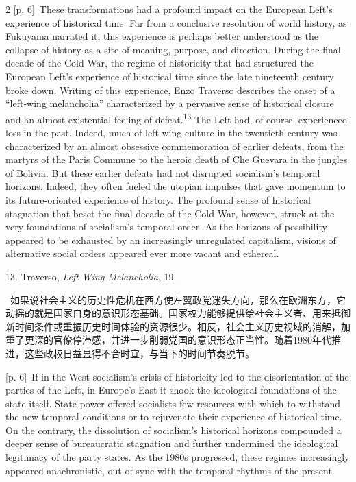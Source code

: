 \documentclass[10pt,a4paper]{article}
\begin{document}
\begin{paracol}{2}
\switchcolumn
{\scriptsize\color{gray} [p. 6]}\ These transformations had a profound impact on the European Left’s experience of historical time. Far from a conclusive resolution of world history, as Fukuyama narrated it, this experience is perhaps better understood as the collapse of history as a site of meaning, purpose, and direction. During the final decade of the Cold War, the regime of historicity that had structured the European Left’s experience of historical time since the late nineteenth century broke down. Writing of this experience, Enzo Traverso describes the onset of a “left-wing melancholia” characterized by a pervasive sense of historical closure and an almost existential feeling of defeat.\nobreak\textsuperscript{13} The Left had, of course, experienced loss in the past. Indeed, much of left-wing culture in the twentieth century was characterized by an almost obsessive commemoration of earlier defeats, from the martyrs of the Paris Commune to the heroic death of Che Guevara in the jungles of Bolivia. But these earlier defeats had not disrupted socialism’s temporal horizons. Indeed, they often fueled the utopian impulses that gave momentum to its future-oriented experience of history. The profound sense of historical stagnation that beset the final decade of the Cold War, however, struck at the very foundations of socialism’s temporal order. As the horizons of possibility appeared to be exhausted by an increasingly unregulated capitalism, visions of alternative social orders appeared ever more vacant and ethereal.\par{\small 13. Traverso, \textit{Left-Wing Melancholia}, 19.\par}
\switchcolumn*
{\scriptsize\color{gray} [p. 6]}\ 如果说社会主义的历史性危机在西方使左翼政党迷失方向，那么在欧洲东方，它动摇的就是国家自身的意识形态基础。国家权力能够提供给社会主义者、用来抵御新时间条件或重振历史时间体验的资源很少。相反，社会主义历史视域的消解，加重了更深的官僚停滞感，并进一步削弱党国的意识形态正当性。随着1980年代推进，这些政权日益显得不合时宜，与当下的时间节奏脱节。\par
\switchcolumn
{\scriptsize\color{gray} [p. 6]}\ If in the West socialism’s crisis of historicity led to the disorientation of the parties of the Left, in Europe’s East it shook the ideological foundations of the state itself. State power offered socialists few resources with which to withstand the new temporal conditions or to rejuvenate their experience of historical time. On the contrary, the dissolution of socialism’s historical horizons compounded a deeper sense of bureaucratic stagnation and further undermined the ideological legitimacy of the party states. As the 1980s progressed, these regimes increasingly appeared anachronistic, out of sync with the temporal rhythms of the present.\par

\end{paracol}
\end{document}
